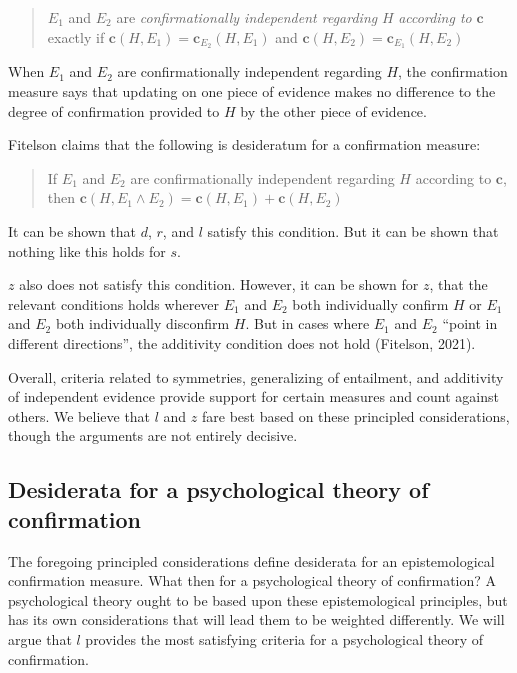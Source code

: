 \documentclass[10pt, letterpaper]{article}
\begin{document}
\begin{quote}
\(E_1\) and \(E_2\) are \emph{confirmationally independent regarding}
\(H\) \emph{according to} \(\mathbf{c}\) exactly if
\(\mathbf{c}(H, E_1)=\mathbf{c}_{E_2}(H, E_1)\) and
\(\mathbf{c}(H, E_2)=\mathbf{c}_{E_1}(H, E_2)\)
\end{quote}

When \(E_1\) and \(E_2\) are confirmationally independent regarding
\(H\), the confirmation measure says that updating on one piece of
evidence makes no difference to the degree of confirmation provided to
\(H\) by the other piece of evidence.

Fitelson claims that the following is desideratum for a confirmation
measure:

\begin{quote}
If \(E_1\) and \(E_2\) are confirmationally independent regarding \(H\)
according to \(\mathbf{c}\), then
\(\mathbf{c}(H, E_1 \wedge E_2)=\mathbf{c}(H, E_1) + \mathbf{c}(H, E_2)\)
\end{quote}

It can be shown that \(d\), \(r\), and \(l\) satisfy this condition. But
it can be shown that nothing like this holds for \(s\).

\(z\) also does not satisfy this condition. However, it can be shown for
\(z\), that the relevant conditions holds wherever \(E_1\) and \(E_2\)
both individually confirm \(H\) or \(E_1\) and \(E_2\) both individually
disconfirm \(H\). But in cases where \(E_1\) and \(E_2\) ``point in
different directions'', the additivity condition does not hold
(Fitelson, 2021).

Overall, criteria related to symmetries, generalizing of entailment, and
additivity of independent evidence provide support for certain measures
and count against others. We believe that \(l\) and \(z\) fare best
based on these principled considerations, though the arguments are not
entirely decisive.

\hypertarget{desiderata-for-a-psychological-theory-of-confirmation}{%
\subsection{Desiderata for a psychological theory of
confirmation}\label{desiderata-for-a-psychological-theory-of-confirmation}}

The foregoing principled considerations define desiderata for an
epistemological confirmation measure. What then for a psychological
theory of confirmation? A psychological theory ought to be based upon
these epistemological principles, but has its own considerations that
will lead them to be weighted differently. We will argue that \(l\)
provides the most satisfying criteria for a psychological theory of
confirmation.
\end{document}
